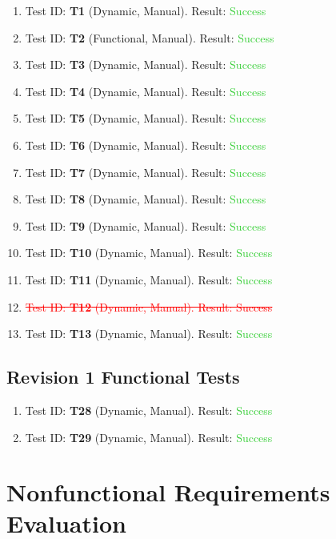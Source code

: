 \documentclass[12pt, titlepage]{article}
\begin{document}
\begin{enumerate}
	\item Test ID: \textbf{T1} (Dynamic, Manual). Result: \textcolor{LimeGreen}{Success}
	\item Test ID: \textbf{T2} (Functional, Manual). Result: \textcolor{LimeGreen}{Success}
	\item Test ID: \textbf{T3} (Dynamic, Manual). Result: \textcolor{LimeGreen}{Success}
	\item Test ID: \textbf{T4} (Dynamic, Manual). Result: \textcolor{LimeGreen}{Success}
	\item Test ID: \textbf{T5} (Dynamic, Manual). Result: \textcolor{LimeGreen}{Success}
	\item Test ID: \textbf{T6} (Dynamic, Manual). Result: \textcolor{LimeGreen}{Success}
	\item Test ID: \textbf{T7} (Dynamic, Manual). Result: \textcolor{LimeGreen}{Success}
	\item Test ID: \textbf{T8} (Dynamic, Manual). Result: \textcolor{LimeGreen}{Success}
	\item Test ID: \textbf{T9} (Dynamic, Manual). Result: \textcolor{LimeGreen}{Success}
	\item Test ID: \textbf{T10} (Dynamic, Manual). Result: \textcolor{LimeGreen}{Success}
	\item Test ID: \textbf{T11} (Dynamic, Manual). Result: \textcolor{LimeGreen}{Success}
	\item \textcolor{red}{\st{Test ID: \textbf{T12} (Dynamic, Manual). Result: Success}}
	\item Test ID: \textbf{T13} (Dynamic, Manual). Result: \textcolor{LimeGreen}{Success}
\end{enumerate}

\subsection{Revision 1 Functional Tests}

\begin{enumerate}
	\item Test ID: \textbf{T28} (Dynamic, Manual). Result: \textcolor{LimeGreen}{Success}
	\item Test ID: \textbf{T29} (Dynamic, Manual). Result: \textcolor{LimeGreen}{Success}
\end{enumerate}


\section{Nonfunctional Requirements Evaluation}
\end{document}
